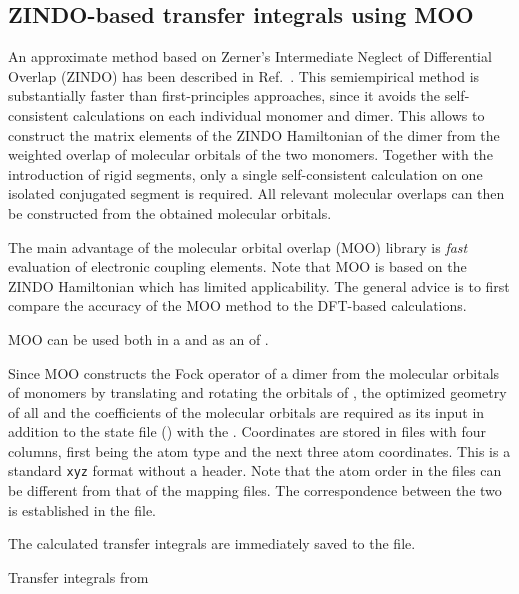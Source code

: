 \subsection{ZINDO-based transfer integrals using MOO }
\label{sec:izindo}

\newcommand{\moo}{MOO\xspace}

An approximate method based on Zerner's Intermediate Neglect of Differential Overlap (ZINDO) has been described in Ref.~\cite{kirkpatrick_approximate_2008}. This semiempirical method is substantially faster than first-principles approaches, since it avoids the self-consistent calculations on each individual monomer and dimer. This allows to construct the matrix elements of the ZINDO Hamiltonian of the dimer from the weighted overlap of molecular orbitals of the two monomers. Together with the introduction of rigid segments, only a single self-consistent calculation on one isolated conjugated segment is required. All relevant molecular overlaps can then be constructed from the obtained molecular orbitals.

The main advantage of the molecular orbital overlap (\moo) library is {\em fast} evaluation of electronic coupling elements. Note that \moo is based on the ZINDO Hamiltonian which has limited applicability. The general advice is to first compare the accuracy of the \moo method to the DFT-based calculations. 

\moo can be used both in a  and as an  \calculator of \votcactp. 

Since \moo constructs the Fock operator of a dimer from the  molecular orbitals of monomers by translating and rotating the orbitals of , the optimized geometry of all  and the coefficients of the molecular orbitals are required as its input in addition to the state file (\sqlstate) with the . Coordinates are stored in \xyz files with four columns, first being the atom type and the next three atom coordinates. This is a standard \texttt{xyz} format without a header. Note that the atom order in the \xyz files can be different from that of the mapping files. The correspondence between the two is established in the \xmlsegments file.

The calculated transfer integrals are immediately saved to the \sqlstate file.
\begin{bclogo}[couleur=bgblue, arrondi =0 , logo=\bcinfo, barre=line,noborder=true]{\small Transfer integrals from }
\itshape {\small \ctprun \opt \xmloptions \sql \sqlstate \exe {} }
\end{bclogo}

